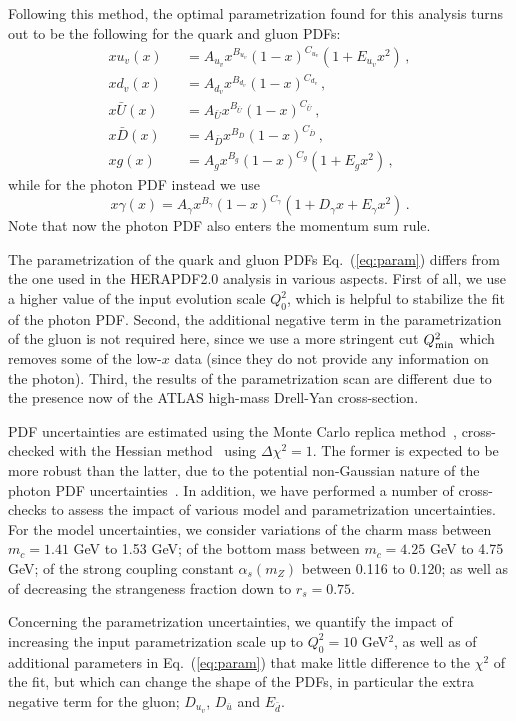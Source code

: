Following this method, the optimal parametrization found for this analysis turns
out to be the following for the quark and gluon PDFs:
\begin{eqnarray}
  \nonumber
  xu_v(x) &&= A_{u_v}x^{B_{u_v}}(1-x)^{C_{u_v}}(1+E_{u_v}x^{2})\, , \\
  \nonumber
xd_v(x) &&= A_{d_v}x^{B_{d_v}}(1-x)^{C_{d_v}}\, , \\
x\bar{U}(x) &&= A_{\bar{U}}x^{B_{\bar{U}}}(1-x)^{C_{\bar{U}}}\, , \\
\nonumber
x\bar{D}(x) &&= A_{\bar{D}}x^{B_{\bar{D}}}(1-x)^{C_{\bar{D}}}\, , \\
\nonumber
\label{eq:param}
xg(x) &&= A_{g}x^{B_{g}}(1-x)^{C_{g}}(1+E_{g}x^{2})\, ,
\end{eqnarray}
while for the photon PDF instead we use
\begin{equation}
x\gamma(x) = A_{\gamma}x^{B_{\gamma}}(1-x)^{C_{\gamma}}(1+D_{\gamma}x+E_{\gamma}x^{2}) \, .
\end{equation}
Note that now the photon PDF also enters the momentum sum rule.

The parametrization of the quark and gluon PDFs Eq.~(\ref{eq:param}) differs from the one used
in the HERAPDF2.0 analysis in various aspects.
%
First of all, we use a higher value of the input evolution scale $Q^2_0$, which is helpful
to stabilize the fit of the photon PDF.
%
Second, the additional negative term in the parametrization of the gluon
is not required here, since we use a more stringent cut $Q_{\rm min}^2$ which removes
some of the low-$x$ data (since they do not provide any information on the photon).
%
Third, the results of the parametrization scan are different due to the presence now
of the ATLAS high-mass Drell-Yan cross-section.

PDF uncertainties are estimated using the Monte Carlo
replica method~\cite{DelDebbio:2004xtd,DelDebbio:2007ee}, cross-checked
with the Hessian method~\cite{Pumplin:2001ct} using $\Delta\chi^2=1$.
%
The former is expected to be more robust than the latter, due to the potential
non-Gaussian nature of the photon PDF uncertainties~\cite{Ball:2013hta}.
%
In addition, we have performed a number of cross-checks to assess the impact
of various model and parametrization uncertainties.
%
For the model uncertainties, we consider variations of the charm mass
between $m_c=1.41$ GeV to 1.53 GeV; of the bottom mass between
$m_c=4.25$ GeV to 4.75 GeV; of the strong
coupling constant $\alpha_s(m_Z)$ between 0.116 to 0.120; as well
as of decreasing the strangeness fraction down to  $r_s=0.75$.


Concerning the parametrization uncertainties, we  quantify the impact of
 increasing the input parametrization scale
 up to $Q_0^2=10$ GeV$^2$, as well as
 of additional parameters in Eq.~(\ref{eq:param}) that make little difference to the $\chi^2$ of the fit, but which can change the shape of the PDFs, in particular the extra negative term for the gluon; $D_{u_v}$, $D_{\bar{u}}$ and $E_{\bar{d}}$.
